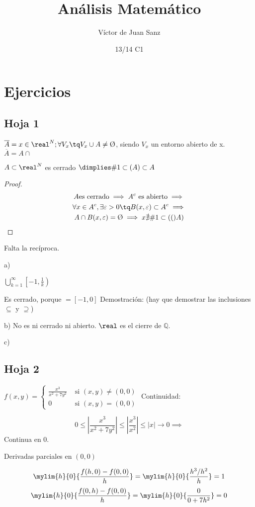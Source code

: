 \documentclass{apuntes}
\title{Análisis Matemático}
\author{Víctor de Juan Sanz}
\date{13/14 C1}
\newcommand{\acum}[1]{\#1 \subset(#1) }
\begin{document}
\setcounter{section}{6}
\section{Ejercicios}
\subsection{Hoja 1}

\begin{problem}[?]
\solution
$\overline{A} = { x \in \real^N; \forall V_x \tq V_x \cup A \neq \text{\O}}$, siendo $V_x$ un entorno abierto de x.
	$\overline{A} = A \cap $ 
	
\begin{theorem}
$A \subset \real^N$ es cerrado $\dimplies \acum{A}\subset A$ 
\end{theorem}

 
\end{problem}
\begin{proof}
\begin{gather*}
A \text{es cerrado} \implies A^c \text{ es abierto} \implies\\
\forall x \in A^c, \exists \varepsilon > 0 \tq B(x,\varepsilon) \subset A^c \implies\\
A \cap B(x,\varepsilon) = \text{\O} \implies x \nexists \acum(A) 
\end{gather*}
\end{proof}
Falta la recíproca.


\begin{problem}[3] 
\solution
a)

$\displaystyle\bigcup_{k=1}^{\infty} \left[-1,\frac{1}{k}\right)$

Es cerrado, porque $=[-1,0]$
Demostración: (hay que demostrar las inclusiones $\subseteq$ y $\supseteq$)

b)
No es ni cerrado ni abierto.
\obs $\real$ es el cierre de $\mathbb{Q}$.

c)
 
\end{problem}

\newpage
\subsection{Hoja 2}

\begin{problem}[?]
\solution
$f(x,y) = \left\{\begin{matrix}
                \displaystyle \frac{x^3}{x^2+7y^2} & \text{ si } (x,y) \neq (0,0)\\
                 0 & \text{ si } (x,y) = (0,0)
                \end{matrix}\right.$
Continuidad:

$$0\leq \left| \frac{x^3}{x^2+7y^2} \right| \leq \left| \frac{x^3}{x^2} \right| \leq |x| \rightarrow 0 \implies$$ Continua en 0.

Derivadas parciales en $(0,0)$

$$\mylim{h}{0} {\frac{f(h,0) - f(0,0)}{h}} = \mylim{h}{0} {\displaystyle\frac{{h^{3}}/{h^{2}}}{h}} = 1$$
$$\mylim{h}{0} {\frac{f(0,h) - f(0,0)}{h}} = \mylim{h}{0} {\frac{0}{0+7h^2}} = 0$$
\end{problem}
 
\end{document}
